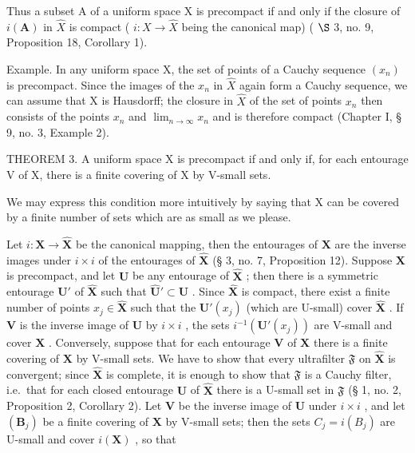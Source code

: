 Thus a subset A of a uniform space X is precompact if and only if the closure of \(i(\mathbf{A})\) in \(\hat{X}\) is compact ( \(i: X \rightarrow \hat{X}\) being the canonical map) ( \(\S\) 3, no. 9, Proposition 18, Corollary 1).

Example. In any uniform space X, the set of points of a Cauchy sequence \((x_{n})\) is precompact. Since the images of the \(x_{n}\) in \(\hat{X}\) again form a Cauchy sequence, we can assume that X is Hausdorff; the closure in \(\hat{X}\) of the set of points \(x_{n}\) then consists of the points \(x_{n}\) and \(\lim_{n\to\infty}x_{n}\) and is therefore compact (Chapter I, § 9, no. 3, Example 2).

THEOREM 3. A uniform space X is precompact if and only if, for each entourage V of X, there is a finite covering of X by V-small sets.

We may express this condition more intuitively by saying that X can be covered by a finite number of sets which are as small as we please.

Let \(i: \mathbf{X} \to \hat{\mathbf{X}}\) be the canonical mapping, then the entourages of \(\mathbf{X}\) are the inverse images under \(i \times i\) of the entourages of \(\hat{\mathbf{X}}\) (§ 3, no. 7, Proposition 12). Suppose \(\mathbf{X}\) is precompact, and let \(\mathbf{U}\) be any entourage of \(\hat{\mathbf{X}}\) ; then there is a symmetric entourage \(\mathbf{U}'\) of \(\hat{\mathbf{X}}\) such that \(\hat{\mathbf{U}}' \subset \mathbf{U}\) . Since \(\hat{\mathbf{X}}\) is compact, there exist a finite number of points \(x_j \in \hat{\mathbf{X}}\) such that the \(\mathbf{U}'(x_j)\) (which are U-small) cover \(\hat{\mathbf{X}}\) . If \(\mathbf{V}\) is the inverse image of \(\mathbf{U}\) by \(i \times i\) , the sets \(i^{-1}(\mathbf{U}'(x_j))\) are V-small and cover \(\mathbf{X}\) . Conversely, suppose that for each entourage \(\mathbf{V}\) of \(\mathbf{X}\) there is a finite covering of \(\mathbf{X}\) by V-small sets. We have to show that every ultrafilter \(\mathfrak{F}\) on \(\hat{\mathbf{X}}\) is convergent; since \(\hat{\mathbf{X}}\) is complete, it is enough to show that \(\mathfrak{F}\) is a Cauchy filter, i.e.~that for each closed entourage \(\mathbf{U}\) of \(\hat{\mathbf{X}}\) there is a U-small set in \(\mathfrak{F}\) (§ 1, no. 2, Proposition 2, Corollary 2). Let \(\mathbf{V}\) be the inverse image of \(\mathbf{U}\) under \(i \times i\) , and let \((\mathbf{B}_j)\) be a finite covering of \(\mathbf{X}\) by V-small sets; then the sets \(C_j = i(B_j)\) are U-small and cover \(i(\mathbf{X})\) , so that

